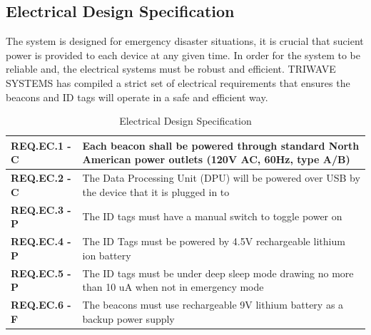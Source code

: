 \pagebreak
\subsection{Electrical Design Specification}
\medskip
The system is designed for emergency disaster situations, it is crucial that sucient power is provided to each device at any given time. In order for the system to be reliable and, the electrical systems must be robust and efficient. TRIWAVE SYSTEMS has compiled a strict set of electrical requirements that ensures the beacons and ID tags will operate in a safe and efficient way.
\medskip
\bgroup
\def\arraystretch{1.5}
\begin{table}[H]
\centering
\begin{tabular}{ | m{3cm} | m{12.5cm} |}
\hline
\textbf{REQ.EC.1 - C} &  Each beacon shall be powered through standard North American power outlets (120V AC, 60Hz, type A/B)\\
\hline
\textbf{REQ.EC.2 - C} &  The Data Processing Unit (DPU) will be powered over USB by the device that it is plugged in to\\
\hline
\textbf{REQ.EC.3 - P} &  The ID tags must have a manual switch to toggle power on \\
\hline
\textbf{REQ.EC.4 - P} &  The ID Tags must be powered by 4.5V rechargeable lithium ion battery\\
\hline
\textbf{REQ.EC.5 - P} &  The ID tags must be under deep sleep mode drawing no more than 10 uA when not in emergency mode\\
\hline
\textbf{REQ.EC.6 - F} &  The beacons must use rechargeable 9V lithium battery as a backup power supply\\
\hline
\end{tabular}
\caption{Electrical Design Specification}
\end{table}
